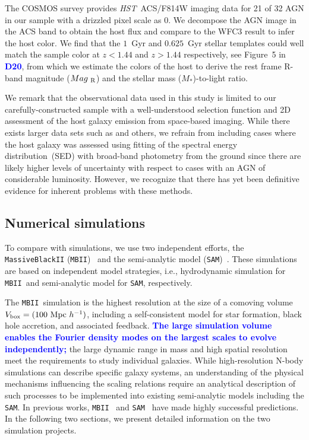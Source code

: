 \documentclass[twocolumn,trackchanges]{aastex63}
\newcommand{\hst}{{\it HST}}
\newcommand{\mr}{$Mag_{\rm ~R}$}
\newcommand{\mstar}{{$M_*$}}
\newcommand{\sam}{\texttt{SAM}}
\newcommand{\mbii}{\texttt{MBII}}
\newcommand{\blue}[1]{{\textcolor{blue}{\bf #1}}}
\begin{document}
The COSMOS survey provides \hst\ ACS/F814W imaging data for 21 of 32 AGN in our sample with a drizzled pixel scale as 0. We decompose the AGN image in the ACS band to obtain the host flux and compare to the WFC3 result to infer the host color. We find that the $1$~Gyr and $0.625$~Gyr stellar templates could well match the sample color at $z<1.44$ and $z>1.44$ respectively, see Figure~5 in \blue{D20}, from which we estimate the colors of the host to derive the rest frame R-band magnitude (\mr) and the stellar mass (\mstar)-to-light ratio.

We remark that the observational data used in this study is limited to our carefully-constructed sample with a well-understood selection function and 2D assessment of the host galaxy emission from space-based imaging. While there exists larger data sets such as \citet{Sun2015} and others, we refrain from including cases where the host galaxy was assessed using fitting of the spectral energy distribution~(SED) with broad-band photometry from the ground since there are likely higher levels of uncertainty with respect to cases with an AGN of considerable luminosity. However, we recognize that there has yet been definitive evidence for inherent problems with these methods.

\subsection{Numerical simulations}\label{sample_sim}
To compare with simulations, we use two independent efforts, the \texttt{MassiveBlackII} (\texttt{MBII})~\citep{Khandai2015} and the semi-analytic model (\texttt{SAM})~\citep{Menci2014}. These simulations are based on independent model strategies, i.e., hydrodynamic simulation for \mbii\ and semi-analytic model for \sam, respectively.

The \mbii\ simulation is the highest resolution at the size of a comoving volume $V_{\rm box} = (100~{\rm Mpc}~h^{-1})$, including a self-consistent model for star formation, black hole accretion, and associated feedback. \blue{The large simulation volume enables the Fourier density modes on the largest scales to evolve independently;} the large dynamic range in mass and high spatial resolution meet the requirements to study individual galaxies. While high-resolution N-body simulations can describe specific galaxy systems, an understanding of the physical mechanisms influencing the scaling relations require an analytical description of such processes to be implemented into existing semi-analytic models including the \sam. In previous works, \mbii~\citep{Huang2018, DeG++15, Khandai2015,Bhowmick2019} and \sam~\citep{Menci2014, Menci2016} have made highly successful predictions. In the following two sections, we present detailed information on the two simulation projects.
\end{document}
